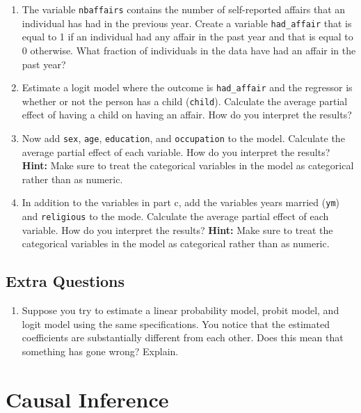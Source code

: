 \documentclass[
  letterpaper,
  DIV=11,
  numbers=noendperiod]{scrreprt}
\providecommand{\tightlist}{%
  \setlength{\itemsep}{0pt}\setlength{\parskip}{0pt}}\usepackage{longtable,booktabs,array}
\begin{document}
\begin{enumerate}
  \begin{enumerate}
  \def\labelenumii{\alph{enumii})}
  \item
    The variable \texttt{nbaffairs} contains the number of self-reported
    affairs that an individual has had in the previous year. Create a
    variable \texttt{had\_affair} that is equal to 1 if an individual
    had any affair in the past year and that is equal to 0 otherwise.
    What fraction of individuals in the data have had an affair in the
    past year?
  \item
    Estimate a logit model where the outcome is \texttt{had\_affair} and
    the regressor is whether or not the person has a child
    (\texttt{child}). Calculate the average partial effect of having a
    child on having an affair. How do you interpret the results?
  \item
    Now add \texttt{sex}, \texttt{age}, \texttt{education}, and
    \texttt{occupation} to the model. Calculate the average partial
    effect of each variable. How do you interpret the results?
    \textbf{Hint:} Make sure to treat the categorical variables in the
    model as categorical rather than as numeric.
  \item
    In addition to the variables in part c, add the variables years
    married (\texttt{ym}) and \texttt{religious} to the mode. Calculate
    the average partial effect of each variable. How do you interpret
    the results? \textbf{Hint:} Make sure to treat the categorical
    variables in the model as categorical rather than as numeric.
  \end{enumerate}
\end{enumerate}

\section{Extra Questions}\label{extra-questions-4}

\begin{enumerate}
\def\labelenumi{\arabic{enumi}.}
\tightlist
\item
  Suppose you try to estimate a linear probability model, probit model,
  and logit model using the same specifications. You notice that the
  estimated coefficients are substantially different from each other.
  Does this mean that something has gone wrong? Explain.
\end{enumerate}


\chapter{Causal Inference}\label{causal-inference}
\end{document}
